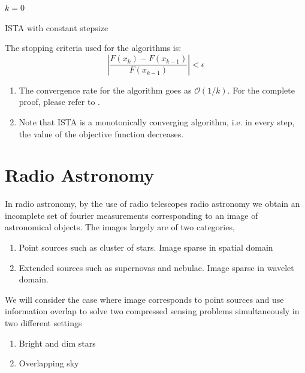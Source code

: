 \vspace{5pt}
\begin{algorithm}[H]
 $k = 0 $ \;
 
 \caption{ISTA with constant stepsize}
\end{algorithm}

The stopping criteria used for the algorithms is:
\begin{equation}
 \left| \frac{F(x_k) - F(x_{k-1})}{F(x_{k-1})} \right| < \epsilon
\end{equation}

\begin{enumerate}
\item The convergence rate for the algorithm goes as $\mathcal{O}(1/k)$.
For the complete proof, please refer to \cite{FISTA}.

\item Note that ISTA is a monotonically converging algorithm, 
i.e. in every step, the value of the objective function decreases.
\end{enumerate}
\section{Radio Astronomy}


In radio astronomy, by the use of radio telescopes radio astronomy  we obtain an incomplete set of fourier measurements corresponding to an image of astronomical objects. The images largely are of two categories,
\begin{enumerate}
\item Point sources such as cluster of stars. Image sparse in spatial domain
\item Extended sources such as supernovas and nebulae. Image sparse in wavelet domain.
\end{enumerate}
We will consider the case where image corresponds to point sources and use information overlap to solve two compressed sensing problems simultaneously in two different settings
\begin{enumerate}
\item Bright and dim stars
\item Overlapping sky
\end{enumerate}

